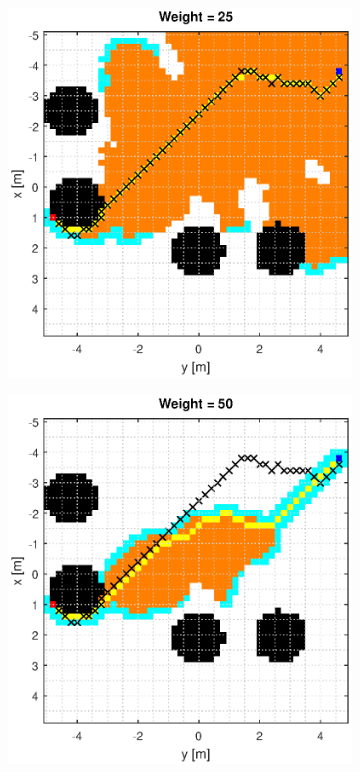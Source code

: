 \documentclass[Space3_Assign3.tex]{subfile}
\begin{document}
\begin{figure}
\begin{subfigure}{0.49\linewidth}
\end{subfigure}
\begin{subfigure}{0.49\linewidth}
\includegraphics[width = 1\linewidth]{Astar_man_25.eps}
\end{subfigure}
\begin{subfigure}{0.49\linewidth}
\includegraphics[width = 1\linewidth]{Astar_man_50.eps}

\end{subfigure}
\end{figure}
\end{document}
